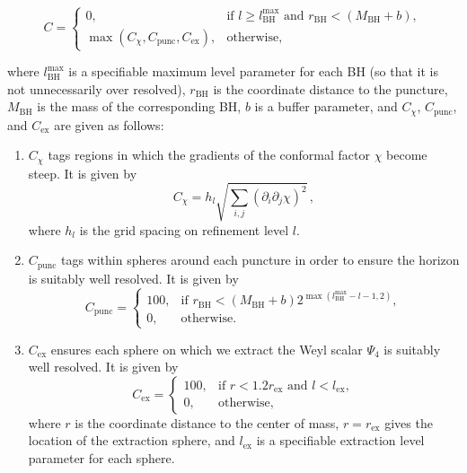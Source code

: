 \begin{equation}
    C=
    \begin{cases}
        0, &\text{if }l\geq l_{\mathrm{BH}}^{\max}
        \text{ and } r_{\mathrm{BH}} < (M_{\mathrm{BH}}+b),\\
        \max(C_{\chi},C_{\mathrm{punc}},C_{\mathrm{ex}}),&
        \text{otherwise},
    \end{cases}
\end{equation}

where $l_{\mathrm{BH}}^{\max}$ is a specifiable maximum level parameter 
for each BH (so that it is not unnecessarily over resolved), 
$r_{\mathrm{BH}}$ is the coordinate distance to the puncture, 
$M_{\mathrm{BH}}$ is the mass of the corresponding BH, $b$ is a buffer 
parameter, and $C_\chi$, $C_{\mathrm{punc}}$, and $C_{\mathrm{ex}}$ are 
given as follows:
\begin{enumerate}
    \item 
        $C_{\chi}$ tags regions in which the gradients of the conformal 
        factor $\chi$ become steep. It is given by
        \begin{equation}
            C_{\chi} = h_l\sqrt{\sum_{i,j}\left(
            \partial_i\partial_j\chi\right)^2}\,,
        \end{equation}
        where $h_l$ is the grid spacing on refinement level $l$.
    \item 
        $C_{\mathrm{punc}}$ tags within spheres around each puncture in 
        order to ensure the horizon is suitably well resolved. It is given 
        by
        \begin{equation}
            C_{\mathrm{punc}} = 
            \begin{cases}
                100, &\text{if } r_{\mathrm{BH}} < 
                (M_{\mathrm{BH}}+b) 2^{\max(l_\mathrm{BH}^{\max}-l-1, 2)}, \\
                0, & \text{otherwise}.
            \end{cases}
        \end{equation}
    \item
        $C_{\mathrm{ex}}$ ensures each sphere on which we extract the 
        Weyl scalar $\Psi_4$ is suitably well resolved. It is given by
        \begin{equation}
            C_{\mathrm{ex}} = 
            \begin{cases}
                100, &\text{if } r < 1.2r_{\mathrm{ex}} \text{ and } 
                l < l_{\mathrm{ex}}, \\
                0, & \text{otherwise},
            \end{cases}
        \end{equation}
         where $r$ is the coordinate distance to the center of mass,
         $r=r_{\mathrm{ex}}$ gives the location of the extraction sphere, 
         and $l_{\mathrm{ex}}$ is a specifiable extraction level parameter 
         for each sphere.
\end{enumerate}
